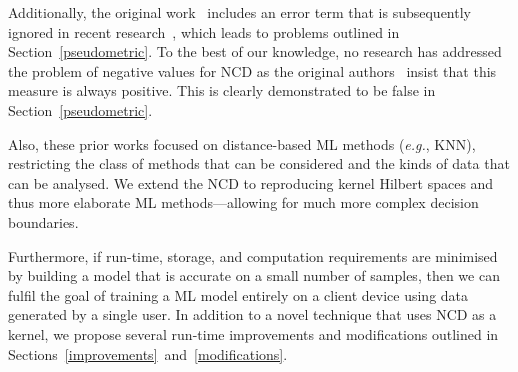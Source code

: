 \documentclass[preprint,12pt]{article}
\begin{document}
Additionally, the original work~\cite{ncd} includes an error term that is subsequently ignored in recent research~\cite{opitz2023gzip,weinreich2023parameter,nishida2011tweet,jiang2022less}, which leads to problems outlined in Section~\ref{pseudometric}.
To the best of our knowledge, no research has addressed the problem of negative values for NCD as the original authors~\cite{ncd} insist that this measure is always positive. 
This is clearly demonstrated to be false in Section~\ref{pseudometric}.


Also, these prior works focused on distance-based ML methods (\textit{e.g.}, KNN), restricting the class of methods that can be considered and the kinds of data that can be analysed.
We extend the NCD to reproducing kernel Hilbert spaces and thus more elaborate ML methods---allowing for much more complex decision boundaries.

Furthermore, if run-time, storage, and computation requirements are minimised by building a model that is accurate on a small number of samples, then we can fulfil the goal of training a ML model entirely on a client device using data generated by a single user. 
In addition to a novel technique that uses NCD as a kernel, we propose several run-time improvements and modifications outlined in Sections~\ref{improvements}~and~\ref{modifications}.
\end{document}
